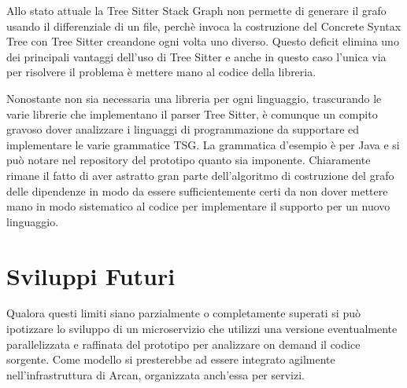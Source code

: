 
Allo stato attuale la Tree Sitter Stack Graph non permette di generare il grafo usando il differenziale di un file, perch\`e invoca la costruzione del Concrete Syntax Tree con Tree Sitter creandone ogni volta uno diverso. Questo deficit elimina uno dei principali vantaggi dell'uso di Tree Sitter e anche in questo caso l'unica via per risolvere il problema \`e mettere mano al codice della libreria.


Nonostante non sia necessaria una libreria per ogni linguaggio, trascurando le varie librerie che implementano il parser Tree Sitter, \`e comunque un compito gravoso dover analizzare i linguaggi di programmazione da supportare ed implementare le varie grammatice TSG. La grammatica d'esempio \`e per Java e si pu\`o notare nel repository del prototipo quanto sia imponente. Chiaramente rimane il fatto di aver astratto gran parte dell'algoritmo di costruzione del grafo delle dipendenze in modo da essere sufficientemente certi da non dover mettere mano in modo sistematico al codice per implementare il supporto per un nuovo linguaggio.

\section{Sviluppi Futuri}

Qualora questi limiti siano parzialmente o completamente superati si pu\`o ipotizzare lo sviluppo di un microservizio che utilizzi una versione eventualmente parallelizzata e raffinata del prototipo per analizzare on demand il codice sorgente. Come modello si presterebbe ad essere integrato agilmente nell'infrastruttura di Arcan, organizzata anch'essa per servizi.
